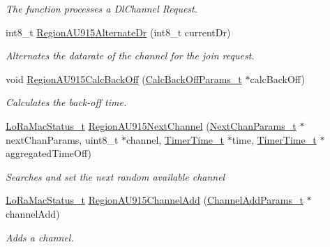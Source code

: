 \begin{DoxyCompactItemize}
\begin{DoxyCompactList}\small\item\em The function processes a Dl\+Channel Request. \end{DoxyCompactList}\item 
int8\+\_\+t \mbox{\hyperlink{group___r_e_g_i_o_n_a_u915_gacbffbc0a51e677e74827e5965a3798a5}{Region\+A\+U915\+Alternate\+Dr}} (int8\+\_\+t current\+Dr)
\begin{DoxyCompactList}\small\item\em Alternates the datarate of the channel for the join request. \end{DoxyCompactList}\item 
void \mbox{\hyperlink{group___r_e_g_i_o_n_a_u915_gaa3847b5ebad54c613afd3b823f1c39e9}{Region\+A\+U915\+Calc\+Back\+Off}} (\mbox{\hyperlink{group___r_e_g_i_o_n_ga7c5c9a8da174e6679eded8257dc92fd9}{Calc\+Back\+Off\+Params\+\_\+t}} $\ast$calc\+Back\+Off)
\begin{DoxyCompactList}\small\item\em Calculates the back-\/off time. \end{DoxyCompactList}\item 
\mbox{\hyperlink{group___l_o_r_a_m_a_c_ga30bd25657e10480f8605ee951b0ecfbd}{Lo\+Ra\+Mac\+Status\+\_\+t}} \mbox{\hyperlink{group___r_e_g_i_o_n_a_u915_ga8c03714f9fa6f024c7d6ff57f24138d1}{Region\+A\+U915\+Next\+Channel}} (\mbox{\hyperlink{group___r_e_g_i_o_n_ga115f5e83afae352c0a3dcdc193374040}{Next\+Chan\+Params\+\_\+t}} $\ast$next\+Chan\+Params, uint8\+\_\+t $\ast$channel, \mbox{\hyperlink{utilities_8h_a4215ca43d3e953099ea758ce428599d0}{Timer\+Time\+\_\+t}} $\ast$time, \mbox{\hyperlink{utilities_8h_a4215ca43d3e953099ea758ce428599d0}{Timer\+Time\+\_\+t}} $\ast$aggregated\+Time\+Off)
\begin{DoxyCompactList}\small\item\em Searches and set the next random available channel \end{DoxyCompactList}\item 
\mbox{\hyperlink{group___l_o_r_a_m_a_c_ga30bd25657e10480f8605ee951b0ecfbd}{Lo\+Ra\+Mac\+Status\+\_\+t}} \mbox{\hyperlink{group___r_e_g_i_o_n_a_u915_ga1065da4a50172d3af558c7bacc28ad10}{Region\+A\+U915\+Channel\+Add}} (\mbox{\hyperlink{group___r_e_g_i_o_n_gab1c5f3aa06614283202906cef4417860}{Channel\+Add\+Params\+\_\+t}} $\ast$channel\+Add)
\begin{DoxyCompactList}\small\item\em Adds a channel. \end{DoxyCompactList}\item 

\end{DoxyCompactItemize}

